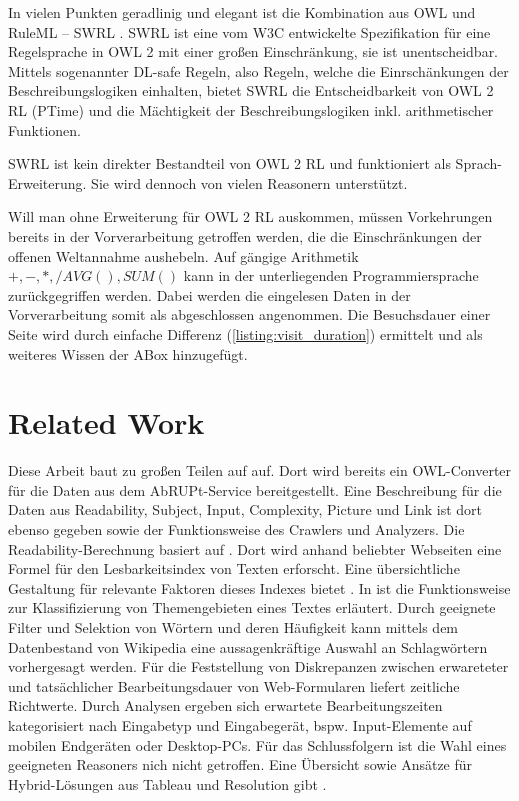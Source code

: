 \documentclass[runningheads,a4paper]{llncs}
\begin{document}
In vielen Punkten geradlinig und elegant ist die Kombination aus OWL und RuleML -- SWRL \cite{swrl}. 
SWRL ist eine vom W3C entwickelte Spezifikation für eine Regelsprache in OWL 2 \cite{owl2} mit einer großen Einschränkung, sie ist unentscheidbar. 
Mittels sogenannter DL-safe Regeln, also Regeln, welche die Einrschänkungen der Beschreibungslogiken einhalten, bietet SWRL die Entscheidbarkeit von OWL 2 RL (PTime) und die Mächtigkeit der Beschreibungslogiken inkl. arithmetischer Funktionen. 

SWRL ist kein direkter Bestandteil von OWL 2 RL und funktioniert als Sprach-Erweiterung. 
Sie wird dennoch von vielen Reasonern unterstützt.

Will man ohne Erweiterung für OWL 2 RL auskommen, müssen Vorkehrungen bereits in der Vorverarbeitung getroffen werden, die die Einschränkungen der offenen Weltannahme aushebeln. 
Auf gängige Arithmetik \(+, -, *, / AVG(), SUM() \) kann in der unterliegenden Programmiersprache zurückgegriffen werden.
Dabei werden die eingelesen Daten in der Vorverarbeitung somit als abgeschlossen angenommen.
Die Besuchsdauer einer Seite wird durch einfache Differenz (\ref{listing:visit_duration}) ermittelt und als weiteres Wissen der ABox hinzugefügt.



\section{Related Work}
\label{sec:related_work}

Diese Arbeit baut zu großen Teilen auf \cite{Brieger} auf. 
Dort wird bereits ein OWL-Converter für die Daten aus dem AbRUPt-Service bereitgestellt.
Eine Beschreibung für die Daten aus Readability, Subject, Input, Complexity, Picture und Link ist dort ebenso gegeben sowie der Funktionsweise des Crawlers und Analyzers.
Die Readability-Berechnung basiert auf \cite{readability}. 
Dort wird anhand beliebter Webseiten eine Formel für den Lesbarkeitsindex von Texten erforscht.
Eine übersichtliche Gestaltung für relevante Faktoren dieses Indexes bietet \cite{lesbarkeit}.
In \cite{subject} ist die Funktionsweise zur Klassifizierung von Themengebieten eines Textes erläutert.
Durch geeignete Filter und Selektion von Wörtern und deren Häufigkeit kann mittels dem Datenbestand von Wikipedia eine aussagenkräftige Auswahl an Schlagwörtern vorhergesagt werden.
Für die Feststellung von Diskrepanzen zwischen erwareteter und tatsächlicher Bearbeitungsdauer von Web-Formularen liefert \cite{web_forms} zeitliche Richtwerte.
Durch Analysen ergeben sich erwartete Bearbeitungszeiten kategorisiert nach Eingabetyp und Eingabegerät, bspw. Input-Elemente auf mobilen Endgeräten oder Desktop-PCs.
Für das Schlussfolgern ist die Wahl eines geeigneten Reasoners nich nicht getroffen.
Eine Übersicht sowie Ansätze für Hybrid-Lösungen aus Tableau und Resolution gibt \cite{hybrid_reasoning}.
\end{document}
